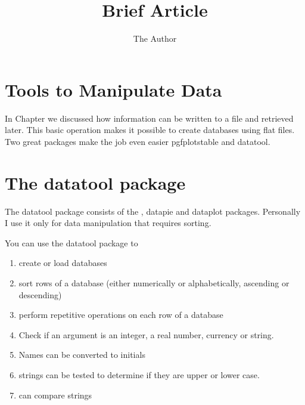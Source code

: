 \documentclass[11pt]{article} %
\title{Brief Article}
\author{The Author}
\begin{document}
\section{Tools to Manipulate Data}

In Chapter we discussed how information can be written to a file and retrieved later. This basic operation makes it 
possible to create databases using flat files. Two great packages make the job even easier
pgfplotstable and datatool. 

\section{The datatool package}

The datatool package consists of the , datapie and dataplot packages. Personally I use it only for data manipulation
that requires sorting.

You can use the datatool package to
\begin{enumerate}
\item create or load databases
\item sort rows of a database (either numerically or alphabetically, ascending or descending)
\item perform repetitive operations on each row of a database
\item Check if an argument is an integer, a real number, currency or string.
\item Names can be converted to initials
\item strings can be tested to determine if they are upper or lower case.
\item can compare strings
\end{enumerate}


\end{document}
